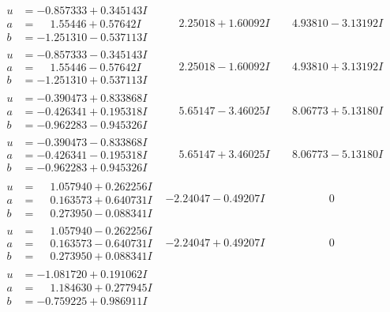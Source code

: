 \documentclass[1p]{elsarticle_modified}
\theoremstyle{definition}
\begin{document}
$$\begin{array}{c|c|c}
\begin{aligned}
u &= -0.857333 + 0.345143 I \\
a &= \phantom{-}1.55446 + 0.57642 I \\
b &= -1.251310 - 0.537113 I\end{aligned}
 & \phantom{-}2.25018 + 1.60092 I & \phantom{-}4.93810 - 3.13192 I \\ \hline\begin{aligned}
u &= -0.857333 - 0.345143 I \\
a &= \phantom{-}1.55446 - 0.57642 I \\
b &= -1.251310 + 0.537113 I\end{aligned}
 & \phantom{-}2.25018 - 1.60092 I & \phantom{-}4.93810 + 3.13192 I \\ \hline\begin{aligned}
u &= -0.390473 + 0.833868 I \\
a &= -0.426341 + 0.195318 I \\
b &= -0.962283 - 0.945326 I\end{aligned}
 & \phantom{-}5.65147 - 3.46025 I & \phantom{-}8.06773 + 5.13180 I \\ \hline\begin{aligned}
u &= -0.390473 - 0.833868 I \\
a &= -0.426341 - 0.195318 I \\
b &= -0.962283 + 0.945326 I\end{aligned}
 & \phantom{-}5.65147 + 3.46025 I & \phantom{-}8.06773 - 5.13180 I \\ \hline\begin{aligned}
u &= \phantom{-}1.057940 + 0.262256 I \\
a &= \phantom{-}0.163573 + 0.640731 I \\
b &= \phantom{-}0.273950 - 0.088341 I\end{aligned}
 & -2.24047 - 0.49207 I & \phantom{-0.000000 } 0 \\ \hline\begin{aligned}
u &= \phantom{-}1.057940 - 0.262256 I \\
a &= \phantom{-}0.163573 - 0.640731 I \\
b &= \phantom{-}0.273950 + 0.088341 I\end{aligned}
 & -2.24047 + 0.49207 I & \phantom{-0.000000 } 0 \\ \hline\begin{aligned}
u &= -1.081720 + 0.191062 I \\
a &= \phantom{-}1.184630 + 0.277945 I \\
b &= -0.759225 + 0.986911 I\end{aligned}

\end{array}$$
\end{document}
